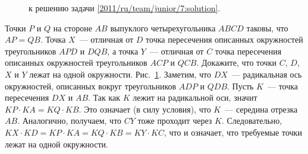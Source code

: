\ifsolution
\begin{figure}\centering
    \caption{к решению задачи \ref{2011/ru/team/junior/7:solution}.}
    \label{2011/ru/team/junior/7:solution:fig}
\end{figure}%
\fi %

\problem{}
Точки $P$ и $Q$ на стороне $AB$ выпуклого четырехугольника $ABCD$ таковы, что
$AP = QB$.
Точка $X$~--- отличная от $D$ точка пересечения описанных окружностей
треугольников $APD$ и $DQB$, а точка $Y$~--- отличная от $C$ точка пересечения
описанных окружностей треугольников $ACP$ и $QCB$.
Докажите, что точки $C$, $D$, $X$ и $Y$ лежат на одной окружности.
\solution
\label{2011/ru/team/junior/7:solution}%
Рис.~\ref{2011/ru/team/junior/7:solution:fig}.
Заметим, что $DX$~--- радикальная ось окружностей, описанных вокруг
треугольников $ADP$ и $QDB$.
Пусть $K$~--- точка пересечения $DX$ и $AB$.
Так как $K$ лежит на радикальной оси, значит $KP \cdot KA = KQ \cdot KB$.
Это означает (в силу условия), что $K$~--- середина отрезка $AB$.
Аналогично, получаем, что $CY$ тоже проходит через $K$.
Следовательно, $KX \cdot KD = KP \cdot KA = KQ \cdot KB = KY \cdot KC$, что и
означает, что требуемые точки лежат на одной окружности.
\endproblem
